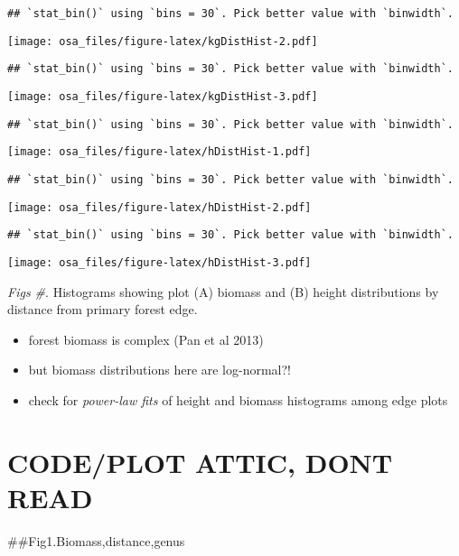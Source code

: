 \documentclass[]{article}
\providecommand{\tightlist}{%
  \setlength{\itemsep}{0pt}\setlength{\parskip}{0pt}}
\begin{document}
\begin{verbatim}
## `stat_bin()` using `bins = 30`. Pick better value with `binwidth`.
\end{verbatim}

\texttt{[image: osa\_files/figure-latex/kgDistHist-2.pdf]}

\begin{verbatim}
## `stat_bin()` using `bins = 30`. Pick better value with `binwidth`.
\end{verbatim}

\texttt{[image: osa\_files/figure-latex/kgDistHist-3.pdf]}

\begin{verbatim}
## `stat_bin()` using `bins = 30`. Pick better value with `binwidth`.
\end{verbatim}

\texttt{[image: osa\_files/figure-latex/hDistHist-1.pdf]}

\begin{verbatim}
## `stat_bin()` using `bins = 30`. Pick better value with `binwidth`.
\end{verbatim}

\texttt{[image: osa\_files/figure-latex/hDistHist-2.pdf]}

\begin{verbatim}
## `stat_bin()` using `bins = 30`. Pick better value with `binwidth`.
\end{verbatim}

\texttt{[image: osa\_files/figure-latex/hDistHist-3.pdf]}

\emph{Figs \#}. Histograms showing plot (A) biomass and (B) height
distributions by distance from primary forest edge.

\begin{itemize}
\tightlist
\item
  forest biomass is complex (Pan et al 2013)
\item
  but biomass distributions here are log-normal?!
\item
  check for \emph{power-law fits} of height and biomass histograms among
  edge plots
\end{itemize}

\hypertarget{codeplot-attic-dont-read}{%
\section{CODE/PLOT ATTIC, DONT READ}\label{codeplot-attic-dont-read}}

\#\#Fig1.Biomass,distance,genus
\end{document}
